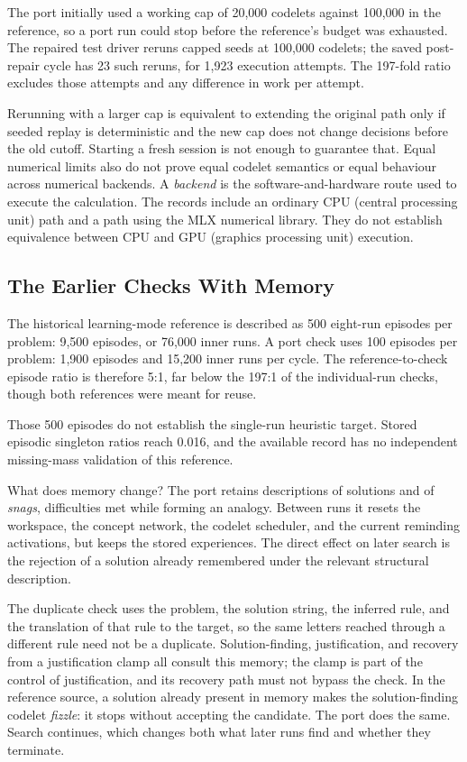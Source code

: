 \documentclass[10pt,letterpaper]{article}
\begin{document}
The port initially used a working cap of 20,000 codelets against 100,000 in the reference,
so a port run could stop before the reference's budget was exhausted. The repaired test
driver reruns capped seeds at 100,000 codelets; the saved post-repair cycle has 23 such
reruns, for 1,923 execution attempts. The 197-fold ratio excludes those attempts and any
difference in work per attempt.

Rerunning with a larger cap is equivalent to extending the original path only if seeded
replay is deterministic and the new cap does not change decisions before the old cutoff.
Starting a fresh session is not enough to guarantee that. Equal numerical limits also do
not prove equal codelet semantics or equal behaviour across numerical backends. A
\emph{backend} is the software-and-hardware route used to execute the calculation. The
records include an ordinary CPU (central processing unit) path and a path using the MLX
numerical library. They do not establish equivalence between CPU and GPU (graphics
processing unit) execution.

\subsection{The Earlier Checks With Memory}\label{sec:episodic-results}

The historical learning-mode reference is described as 500 eight-run episodes per problem:
9,500 episodes, or 76,000 inner runs. A port check uses 100 episodes per problem: 1,900
episodes and 15,200 inner runs per cycle. The reference-to-check episode ratio is
therefore 5:1, far below the 197:1 of the individual-run checks, though both references
were meant for reuse.

Those 500 episodes do not establish the single-run heuristic target. Stored episodic
singleton ratios reach 0.016, and the available record has no independent missing-mass
validation of this reference.

What does memory change? The port retains descriptions of solutions and of \emph{snags},
difficulties met while forming an analogy. Between runs it resets the workspace, the
concept network, the codelet scheduler, and the current reminding activations, but keeps
the stored experiences. The direct effect on later search is the rejection of a solution
already remembered under the relevant structural description.

The duplicate check uses the problem, the solution string, the inferred rule, and the
translation of that rule to the target, so the same letters reached through a different
rule need not be a duplicate. Solution-finding, justification, and recovery from a
justification clamp all consult this memory; the clamp is part of the control of
justification, and its recovery path must not bypass the check. In the reference source, a
solution already present in memory makes the solution-finding codelet \emph{fizzle}: it
stops without accepting the candidate. The port does the same. Search continues, which
changes both what later runs find and whether they terminate.
\end{document}

